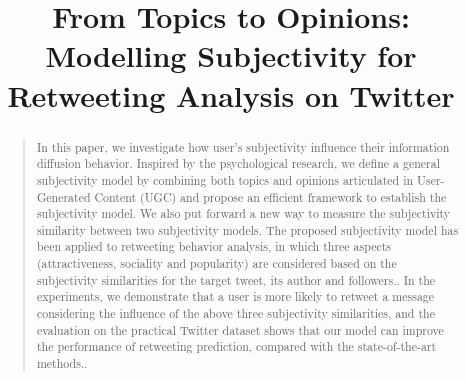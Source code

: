 \documentclass[letterpaper]{article}
\begin{document}
%
\title{From Topics to Opinions: \\Modelling Subjectivity for Retweeting Analysis on Twitter}
\nocopyright
\maketitle
\begin{abstract}
\begin{quote}
In this paper, we investigate how user's subjectivity influence their information diffusion behavior. 
Inspired by the psychological research, we define a general subjectivity model by combining both topics and opinions articulated in User-Generated Content (UGC) and propose an efficient framework to establish the subjectivity model. 
We also put forward a new way to measure the subjectivity similarity between two subjectivity models. The proposed subjectivity model has been applied to retweeting behavior analysis, in which three aspects (attractiveness, sociality and popularity) are considered based on the subjectivity similarities for the target tweet, its author and followers.. In the experiments, we demonstrate that a user is more likely to retweet a message considering the influence of the above three subjectivity similarities, and the evaluation on the practical Twitter dataset shows that our  model can improve the performance of retweeting prediction, compared with the state-of-the-art methods..
\end{quote}
\end{abstract}
\end{document}
